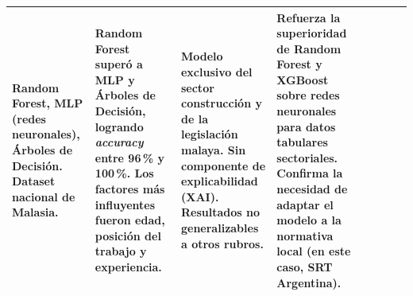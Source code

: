 \begin{landscape}
\begin{longtable}{@{}p{1.6cm}p{2.4cm}p{2.2cm}p{2.4cm}p{2cm}p{2.2cm}p{2.4cm}p{2.6cm}@{}}
		Random Forest, MLP (redes neuronales), \'Arboles de Decisi\'on. Dataset nacional de Malasia. &
		Random Forest super\'o a MLP y \'Arboles de Decisi\'on, logrando \emph{accuracy} entre 96\,\% y 100\,\%. Los factores m\'as influyentes fueron edad, posici\'on del trabajo y experiencia. &
		Modelo exclusivo del sector construcci\'on y de la legislaci\'on malaya. Sin componente de explicabilidad (XAI). Resultados no generalizables a otros rubros. &
		Refuerza la superioridad de Random Forest y XGBoost sobre redes neuronales para datos tabulares sectoriales. Confirma la necesidad de adaptar el modelo a la normativa local (en este caso, SRT Argentina). \\
		\hline
	\end{longtable}
\end{landscape}
